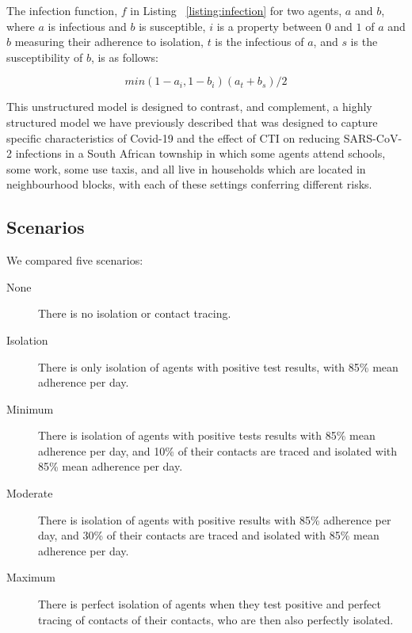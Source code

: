 \documentclass{article}
\begin{document}
The infection function, $f$ in Listing ~\ref{listing:infection} for two agents,
$a$ and $b$, where $a$ is infectious and $b$ is susceptible, $i$ is a property
between $0$ and $1$ of $a$ and $b$ measuring their adherence to isolation, $t$
is the infectious of $a$, and $s$ is the susceptibility of $b$, is
as follows:

\begin{equation}
min(1-a_i,1-b_i) (a_t+b_s)/2
\end{equation}

This unstructured model is designed to contrast, and complement, a highly
structured model we have previously described that was designed to capture
specific characteristics of Covid-19 and the effect of CTI on reducing
SARS-CoV-2 infections in a South African township in which some agents attend
schools, some work, some use taxis, and all live in households which are located
in neighbourhood blocks, with each of these settings conferring different
risks.\cite{Low2020}

\subsection{Scenarios}

We compared five scenarios:

\begin{description}

\item[None] There is no isolation or contact tracing.

\item[Isolation] There is only isolation of agents with positive test results,
  with 85\% mean adherence per day.

\item[Minimum] There is isolation of agents with positive tests results with
  85\% mean adherence per day, and 10\% of their contacts are traced and
  isolated with 85\% mean adherence per day.

\item[Moderate] There is isolation of agents with positive results with 85\%
  adherence per day, and 30\% of their contacts are traced and isolated with
  85\% mean adherence per day.

\item[Maximum] There is perfect isolation of agents when they test positive and
  perfect tracing of contacts of their contacts, who are then also perfectly
  isolated.

\end{description}
\end{document}
